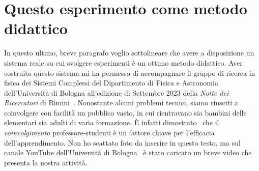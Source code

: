 \section{Questo esperimento come metodo didattico}
In questo ultimo, breve paragrafo voglio sottolineare che avere a disposizione
un sistema reale su cui svolgere esperimenti è un ottimo metodo didattico.
Aver costruito questo sistema mi ha permesso di
accompagnare il gruppo di ricerca in fisica dei Sistemi Complessi
del Dipartimento di Fisica e Astronomia dell'Università di Bologna
all'edizione di Settembre 2023 della \emph{Notte dei Ricercatori} di Rimini~\cite{notteRicercator}.
Nonostante alcuni problemi tecnici\footnotemark, siamo riusciti a coinvolgere con facilità un pubblico
vasto, in cui rientravano sia bambini delle elementari sia adulti di
varia formazione.
È infatti dimostrato~\cite{Hake_1998} che il \emph{coinvolgimento} professore-studenti
è un fattore chiave per l'efficacia dell'apprendimento.
Non ho scattato foto da inserire in questo testo,
ma sul canale YouTube dell'Università di Bologna~\cite{youtube} è stato caricato un breve
video che presenta la nostra attività.

